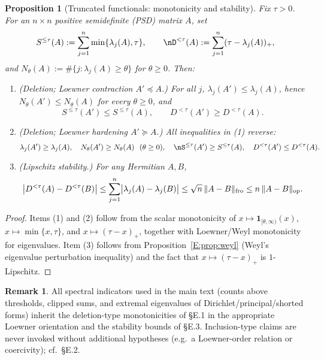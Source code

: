 \documentclass[11pt]{article}
\numberwithin{equation}{section}
\newtheorem{proposition}[theorem]{Proposition}
\theoremstyle{definition}
\newtheorem{remark}[theorem]{Remark}
\providecommand{\n}{\unskip\space}
\begin{document}
\begin{proposition}[Truncated functionals: monotonicity and stability]\label{E:prop:trunc-func}
Fix $\tau>0$. For an $n\times n$ positive semidefinite (PSD) matrix $A$, set
\[
S^{\le\tau}(A):=\sum_{j=1}^n \min\{\lambda_j(A),\tau\},\n\qquad\nD^{<\tau}(A):=\sum_{j=1}^n (\tau-\lambda_j(A))_{+},
\]
and $N_\theta(A):=\#\{j:\lambda_j(A)\ge \theta\}$ for $\theta\ge 0$. Then:
\begin{enumerate}\setlength{\itemsep}{0.2em}
\item \emph{(Deletion; Loewner contraction $A'\preceq A$.)}
For all $j$, $\lambda_j(A')\le \lambda_j(A)$, hence $N_\theta(A')\le N_\theta(A)$ for every $\theta\ge 0$, and
\[
S^{\le\tau}(A')\le S^{\le\tau}(A),\qquad D^{<\tau}(A')\ge D^{<\tau}(A).
\]
\item \emph{(Deletion; Loewner hardening $A'\succeq A$.)}
All inequalities in \textup{(1)} reverse:
\[
\lambda_j(A')\ge \lambda_j(A),\quad N_\theta(A')\ge N_\theta(A)\ \ (\theta\ge 0),\quad\nS^{\le\tau}(A')\ge S^{\le\tau}(A),\quad D^{<\tau}(A')\le D^{<\tau}(A).
\]
\item \emph{(Lipschitz stability.)} For any Hermitian $A,B$,
\[
\bigl|D^{<\tau}(A)-D^{<\tau}(B)\bigr|\n\le \sum_{j=1}^n \bigl|\lambda_j(A)-\lambda_j(B)\bigr|\n\le \sqrt{n}\,\|A-B\|_{\mathrm{fro}}\n\le n\,\|A-B\|_{\mathrm{op}}.
\]
\end{enumerate}
\end{proposition}

\begin{proof}
Items (1) and (2) follow from the scalar monotonicity of
\(x\mapsto \mathbf{1}_{[\theta,\infty)}(x)\), \(x\mapsto \min\{x,\tau\}\), and \(x\mapsto (\tau-x)_+\),
together with Loewner/Weyl monotonicity for eigenvalues.
Item (3) follows from Proposition~\ref{E:prop:weyl} (Weyl’s eigenvalue perturbation inequality)
and the fact that \(x\mapsto(\tau-x)_+\) is \(1\)-Lipschitz.
\end{proof}

\begin{remark}
All spectral indicators used in the main text (counts above thresholds, clipped sums, and extremal eigenvalues of Dirichlet/principal/shorted forms) inherit the deletion-type monotonicities of §E.1 in the appropriate Loewner orientation and the stability bounds of §E.3.
Inclusion-type claims are never invoked without additional hypotheses (e.g.\ a Loewner-order relation or coercivity); cf.\ §E.2.
\end{remark}

\end{document}
